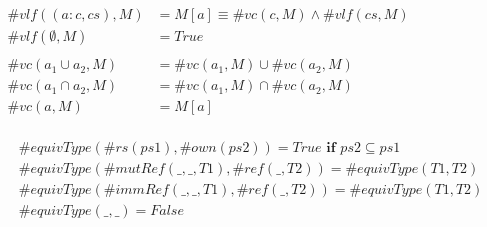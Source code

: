 \begin{figure}[t]
    \centering
     \begin{subfigure}{\textwidth}
        \begin{align*}
            \#vlf((a : c, cs), M) &=  M[a] \equiv \#vc(c, M) \land \#vlf(cs, M) \\
            \#vlf(\emptyset, M) &=  True \\
            \\
            \#vc(a_1 \cup a_2, M) &= \#vc(a_1, M) \cup \#vc(a_2, M) \\
            \#vc(a_1 \cap a_2, M) &= \#vc(a_1, M) \cap \#vc(a_2, M) \\
            \#vc(a, M) &= M[a] \\
        \end{align*}
    \end{subfigure}

    \begin{subfigure}{\textwidth}
        \begin{align*}
            & \#equivType(\#rs(ps1), \#own(ps2)) = True \textbf{ if } ps2 \subseteq ps1 \\
            & \#equivType(\#mutRef(\_, \_, T1), \#ref(\_, T2)) = \#equivType(T1, T2) \\
            & \#equivType(\#immRef(\_, \_, T1), \#ref(\_, T2)) = \#equivType(T1, T2) \\
            & \#equivType(\_, \_) = False \\
        \end{align*}
    \end{subfigure}
    \label{fig:vlf}
\end{figure}
    
